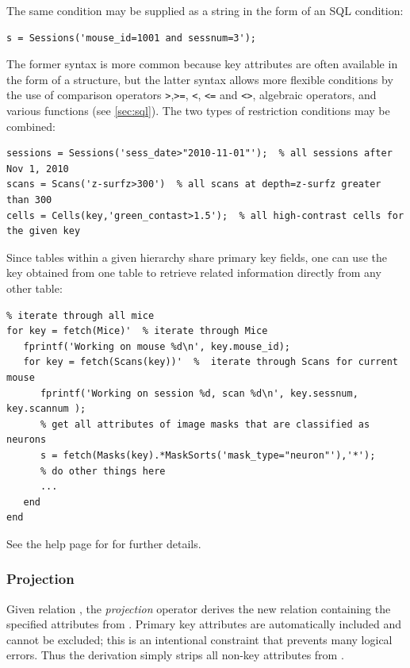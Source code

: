 \documentclass[10pt]{article}
\begin{document}
The same condition may be supplied as a string in the form of an SQL condition:
\begin{lstlisting}
s = Sessions('mouse_id=1001 and sessnum=3');
\end{lstlisting}

The former syntax is more common because key attributes are often available in the form of a structure, but the latter syntax allows more flexible conditions by the use of comparison operators {\tt>},{\tt>=}, {\tt<}, {\tt<=} and {\tt <>}, algebraic operators, and various functions (see \autoref{sec:sql}).  The two types of restriction conditions may be combined:
\begin{lstlisting}
sessions = Sessions('sess_date>"2010-11-01"');  % all sessions after Nov 1, 2010
scans = Scans('z-surfz>300')  % all scans at depth=z-surfz greater than 300
cells = Cells(key,'green_contast>1.5');  % all high-contrast cells for the given key 
\end{lstlisting}

Since tables within a given hierarchy share primary key fields, one can use the key obtained from one table to retrieve related information directly from any other table:
\begin{lstlisting}
% iterate through all mice
for key = fetch(Mice)'  % iterate through Mice
   fprintf('Working on mouse %d\n', key.mouse_id);
   for key = fetch(Scans(key))'  %  iterate through Scans for current mouse
      fprintf('Working on session %d, scan %d\n', key.sessnum, key.scannum );
      % get all attributes of image masks that are classified as neurons
      s = fetch(Masks(key).*MaskSorts('mask_type="neuron"'),'*'); 
      % do other things here
      ...
   end
end
\end{lstlisting}

See the help page for  for further details.

\subsubsection{Projection}\label{sec:pro}
Given relation , the {\em projection} operator  derives the new relation  containing the specified attributes from .  Primary key attributes are automatically included and cannot be excluded; this is an intentional constraint that prevents many logical errors. Thus the derivation  simply strips all non-key attributes from .
\end{document}
